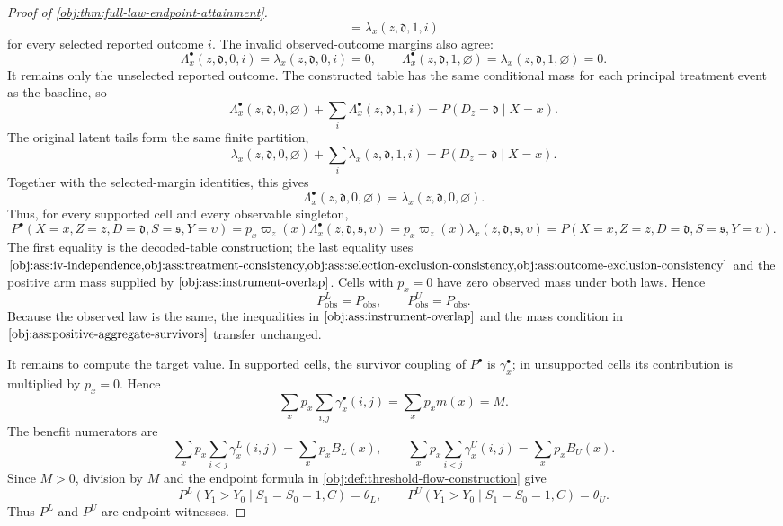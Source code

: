 \begin{proof}[Proof of \cref{obj:thm:full-law-endpoint-attainment}]
\[=
\lambda_x(z,\mathfrak d,1,i)
\]
for every selected reported outcome \(i\).  The invalid observed-outcome margins also agree:
\[
\Lambda^\bullet_x(z,\mathfrak d,0,i)=\lambda_x(z,\mathfrak d,0,i)=0,
\qquad
\Lambda^\bullet_x(z,\mathfrak d,1,\varnothing)=\lambda_x(z,\mathfrak d,1,\varnothing)=0.
\]
It remains only the unselected reported outcome.  The constructed table has the same conditional mass for each principal treatment event as the baseline, so
\[
\Lambda^\bullet_x(z,\mathfrak d,0,\varnothing)
+
\sum_i\Lambda^\bullet_x(z,\mathfrak d,1,i)
=
P(D_z=\mathfrak d\mid X=x).
\]
The original latent tails form the same finite partition,
\[
\lambda_x(z,\mathfrak d,0,\varnothing)
+
\sum_i\lambda_x(z,\mathfrak d,1,i)
=
P(D_z=\mathfrak d\mid X=x).
\]
Together with the selected-margin identities, this gives
\[
\Lambda^\bullet_x(z,\mathfrak d,0,\varnothing)
=
\lambda_x(z,\mathfrak d,0,\varnothing).
\]
Thus, for every supported cell and every observable singleton,
\[
P^\bullet(X=x,Z=z,D=\mathfrak d,S=\mathfrak s,Y=\upsilon)
=
p_x\varpi_z(x)\Lambda^\bullet_x(z,\mathfrak d,\mathfrak s,\upsilon)
=
p_x\varpi_z(x)\lambda_x(z,\mathfrak d,\mathfrak s,\upsilon)
=
P(X=x,Z=z,D=\mathfrak d,S=\mathfrak s,Y=\upsilon).
\]
The first equality is the decoded-table construction; the last equality uses \(\cref{obj:ass:iv-independence,obj:ass:treatment-consistency,obj:ass:selection-exclusion-consistency,obj:ass:outcome-exclusion-consistency}\) and the positive arm mass supplied by \(\cref{obj:ass:instrument-overlap}\).  Cells with \(p_x=0\) have zero observed mass under both laws.  Hence
\[
P^L_{\mathrm{obs}}=P_{\mathrm{obs}},
\qquad
P^U_{\mathrm{obs}}=P_{\mathrm{obs}}.
\]
Because the observed law is the same, the inequalities in \(\cref{obj:ass:instrument-overlap}\) and the mass condition in \(\cref{obj:ass:positive-aggregate-survivors}\) transfer unchanged. %

It remains to compute the target value.  In supported cells, the survivor coupling of \(P^\bullet\) is \(\gamma^\bullet_x\); in unsupported cells its contribution is multiplied by \(p_x=0\).  Hence
\[
\sum_x p_x\sum_{i,j}\gamma^\bullet_x(i,j)
=
\sum_x p_xm(x)
=
M.
\]
The benefit numerators are
\[
\sum_x p_x\sum_{i<j}\gamma^L_x(i,j)
=
\sum_x p_xB_L(x),
\qquad
\sum_x p_x\sum_{i<j}\gamma^U_x(i,j)
=
\sum_x p_xB_U(x).
\]
Since \(M>0\), division by \(M\) and the endpoint formula in \cref{obj:def:threshold-flow-construction} give
\[
P^L(Y_1>Y_0\mid S_1=S_0=1,C)=\theta_L,
\qquad
P^U(Y_1>Y_0\mid S_1=S_0=1,C)=\theta_U.
\]
Thus \(P^L\) and \(P^U\) are endpoint witnesses. %


\end{proof}
